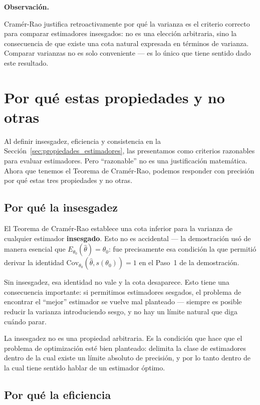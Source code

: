 \documentclass[12pt, a4paper]{book}
\newenvironment{observacion}{%
    \par\medskip\noindent\textbf{\color{azul}Observaci\'{o}n.}\enspace\itshape
}{\par\medskip}
\numberwithin{equation}{chapter}
\begin{document}
\begin{observacion}
	Cram\'{e}r-Rao justifica retroactivamente por qu\'{e}
	la varianza es el criterio correcto para comparar
	estimadores insesgados: no es una elecci\'{o}n
	arbitraria, sino la consecuencia de que existe una
	cota natural expresada en t\'{e}rminos de varianza.
	Comparar varianzas no es solo conveniente --- es lo
	\'{u}nico que tiene sentido dado este resultado.
\end{observacion}

\section{Por qu\'{e} estas propiedades y no otras}

Al definir insesgadez, eficiencia y consistencia en la
Secci\'{o}n~\ref{sec:propiedades_estimadores}, las
presentamos como criterios razonables para evaluar
estimadores. Pero ``razonable'' no es una justificaci\'{o}n
matem\'{a}tica. Ahora que tenemos el Teorema de
Cram\'{e}r-Rao, podemos responder con precisi\'{o}n por
qu\'{e} estas tres propiedades y no otras.

\subsection{Por qu\'{e} la insesgadez}

El Teorema de Cram\'{e}r-Rao establece una cota inferior
para la varianza de cualquier estimador
\textbf{insesgado}. Esto no es accidental --- la
demostraci\'{o}n us\'{o} de manera esencial que
$E_{\theta_0}(\hat{\theta}) = \theta_0$: fue precisamente
esa condici\'{o}n la que permiti\'{o} derivar la identidad
$\mathrm{Cov}_{\theta_0}(\hat{\theta}, s(\theta_0)) = 1$
en el Paso~1 de la demostraci\'{o}n.

Sin insesgadez, esa identidad no vale y la cota
desaparece. Esto tiene una consecuencia importante: si
permitimos estimadores sesgados, el problema de encontrar
el ``mejor'' estimador se vuelve mal planteado --- siempre
es posible reducir la varianza introduciendo sesgo, y no
hay un l\'{i}mite natural que diga cu\'{a}ndo parar.

La insesgadez no es una propiedad arbitraria. Es la
condici\'{o}n que hace que el problema de optimizaci\'{o}n
est\'{e} bien planteado: delimita la clase de estimadores
dentro de la cual existe un l\'{i}mite absoluto de
precisi\'{o}n, y por lo tanto dentro de la cual tiene
sentido hablar de un estimador \'{o}ptimo.

\subsection{Por qu\'{e} la eficiencia}
\end{document}
